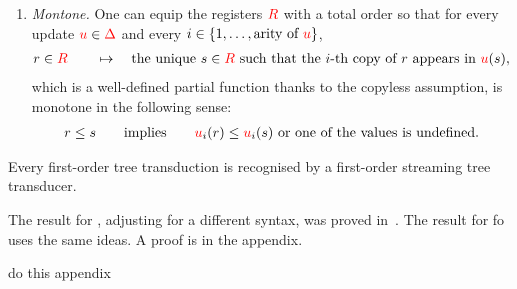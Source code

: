 \begin{definition}
\begin{itemize}
\begin{enumerate}
        \item \emph{Montone.} One can equip the registers ${{\color{red}{R}}}$ with a total order so that for every update ${\color{red}{u}} \in {\color{red}{\Delta}}$ and  every $i \in \{1,\ldots,\text{arity of ${\color{red}{u}}$}\}$,
        \begin{align*} 
            r \in {{\color{red}{R}}} \qquad \mapsto \quad \text{the unique $s \in {{\color{red}{R}}}$ such that the $i$-th copy of $r$ appears in ${\color{red}{u}}(s)$},
        \end{align*}
        which is a well-defined partial function thanks to the copyless assumption, is monotone in the following sense:
        \begin{align*}
            r \leq s \qquad \text{implies} \qquad  {\color{red}{u}}_i(r) \le  {\color{red}{u}}_i(s) \text{ or one of the values is undefined.}
        \end{align*}
    \end{enumerate}
    \end{itemize}

    
\end{definition}


\begin{proposition}\label{prop:stt}
    Every first-order tree transduction is recognised by a first-order streaming tree transducer. 
\end{proposition}

The result for \mso, adjusting for a different syntax,  was proved in~\cite[Theorem 4.6]{alur2017streaming}. The result for fo uses the same ideas. A proof is in the appendix.
\begin{center}
    do this appendix 
\end{center}





